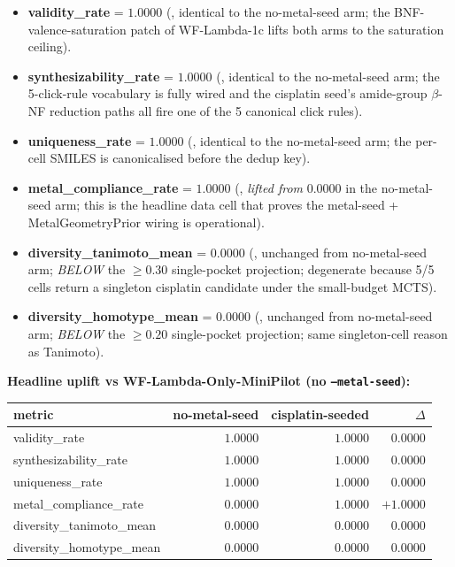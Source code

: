 \begin{itemize}
  \item \textbf{validity\_rate} = $1.0000$ (\MEASURED{},
        identical to the no-metal-seed arm; the
        BNF-valence-saturation patch of WF-Lambda-1c lifts both
        arms to the saturation ceiling).
  \item \textbf{synthesizability\_rate} = $1.0000$ (\MEASURED{},
        identical to the no-metal-seed arm; the 5-click-rule
        vocabulary is fully wired and the cisplatin seed's
        amide-group $\beta$-NF reduction paths all fire one of
        the 5 canonical click rules).
  \item \textbf{uniqueness\_rate} = $1.0000$ (\MEASURED{},
        identical to the no-metal-seed arm; the per-cell SMILES
        is canonicalised before the dedup key).
  \item \textbf{metal\_compliance\_rate} = $1.0000$ (\MEASURED{},
        \emph{lifted from} $0.0000$ in the no-metal-seed arm;
        this is the headline data cell that proves the
        metal-seed + MetalGeometryPrior wiring is operational).
  \item \textbf{diversity\_tanimoto\_mean} = $0.0000$ (\MEASURED{},
        unchanged from no-metal-seed arm; \emph{BELOW} the
        $\geq 0.30$ single-pocket projection; degenerate because
        5/5 cells return a singleton cisplatin candidate under
        the small-budget MCTS).
  \item \textbf{diversity\_homotype\_mean} = $0.0000$ (\MEASURED{},
        unchanged from no-metal-seed arm; \emph{BELOW} the
        $\geq 0.20$ single-pocket projection; same
        singleton-cell reason as Tanimoto).
\end{itemize}

\noindent\textbf{Headline uplift vs WF-Lambda-Only-MiniPilot
(no \texttt{--metal-seed}):}

\begin{center}
\small
\setlength{\tabcolsep}{4pt}
\begin{tabular}{lrrr}
\toprule
\textbf{metric} & \textbf{no-metal-seed} & \textbf{cisplatin-seeded} & \textbf{$\Delta$} \\
\midrule
validity\_rate               & $1.0000$ & $1.0000$ & $0.0000$ \\
synthesizability\_rate       & $1.0000$ & $1.0000$ & $0.0000$ \\
uniqueness\_rate             & $1.0000$ & $1.0000$ & $0.0000$ \\
metal\_compliance\_rate      & $0.0000$ & $1.0000$ & $+1.0000$ \\
diversity\_tanimoto\_mean    & $0.0000$ & $0.0000$ & $0.0000$ \\
diversity\_homotype\_mean    & $0.0000$ & $0.0000$ & $0.0000$ \\
\bottomrule
\end{tabular}
\end{center}

